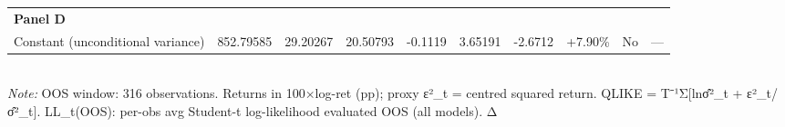 \begin{table}[ht]
\begin{tabular}{lrrrrrrrrr}
\multicolumn{10}{l}{\textbf{Panel D}} \\
Constant (unconditional variance) & 852.79585 & 29.20267 & 20.50793 & -0.1119 & 3.65191 & -2.6712 & +7.90\% & No & — \\
\bottomrule
\end{tabular}
\\[3pt]\footnotesize\textit{Note:} OOS window: 316 observations. Returns in 100×log-ret (pp); proxy ε²_t = centred squared return. QLIKE = T⁻¹Σ[lnσ̂²_t + ε²_t/σ̂²_t]. LL_t(OOS): per-obs avg Student-t log-likelihood evaluated OOS (all models). Δ%
\end{table}
